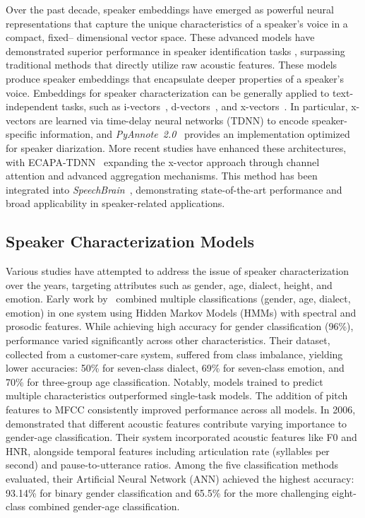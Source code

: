 Over the past decade, speaker embeddings have emerged as powerful neural representations that capture the unique characteristics of a speaker's voice in a compact, fixed--
dimensional vector space. These advanced models have demonstrated superior performance in speaker identification tasks \cite{BAI202165}, surpassing traditional methods that directly utilize raw acoustic features. These models produce speaker embeddings that encapsulate deeper properties of a speaker's voice. Embeddings for speaker characterization can be generally applied to text-independent tasks, such as i-vectors~\cite{dehak2010front, kanagasundaram2011vector}, d-vectors~\cite{variani2014deep,jung2017d,8462628}, and x-vectors~\cite{snyder2017deep, zeinali2018convolutional}. In particular, x-vectors are learned via time-delay neural networks (TDNN) to encode speaker-specific information, and \textit{PyAnnote~2.0}~\cite{Bredin2021} provides an implementation optimized for speaker diarization. 
More recent studies have enhanced these architectures, with ECAPA-TDNN~\cite{Desplanques_2020} 
expanding the x-vector approach through channel attention and advanced aggregation mechanisms. This method has been integrated into \textit{SpeechBrain}~\cite{speechbrain, Dawalatabad_2021}, demonstrating state-of-the-art performance and broad applicability in speaker-related applications.

\subsection{Speaker Characterization Models}
\label{ssec:model_inf}

Various studies have attempted to address the issue of speaker characterization over the years, targeting attributes such as gender, age, dialect, height, and emotion. Early work by~\citet{shafran2003voice} combined multiple classifications (gender, age, dialect, emotion) in one system using Hidden Markov Models (HMMs) with spectral and prosodic features. While achieving high accuracy for gender classification (96\%), performance varied significantly across other characteristics. Their dataset, collected from a customer-care system, suffered from class imbalance, yielding lower accuracies: 50\% for seven-class dialect, 69\% for seven-class emotion, and 70\% for three-group age classification. Notably, models trained to predict multiple characteristics outperformed single-task models. The addition of pitch features to MFCC consistently improved performance across all models.
In 2006,~\citet{muller2006automatic} demonstrated that different acoustic features contribute varying importance to gender-age classification. Their system incorporated acoustic features like F0 and HNR, alongside temporal features including articulation rate (syllables per second) and pause-to-utterance ratios. Among the five classification methods evaluated, their Artificial Neural Network (ANN) achieved the highest accuracy: 93.14\% for binary gender classification and 65.5\% for the more challenging eight-class combined gender-age classification.

